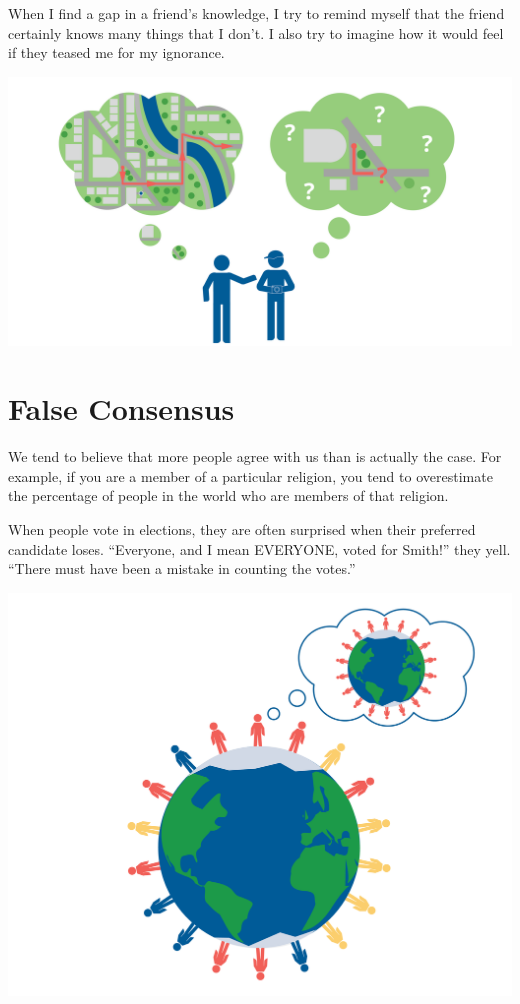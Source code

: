 When I find a gap in a friend's knowledge, I try to remind myself that
the friend certainly knows many things that I don't. I also try to
imagine how it would feel if they teased me for my ignorance.

\includegraphics[width=1\textwidth]{curseOfKnowledge.png}

\section{False Consensus}

We tend to believe that more people agree with us than is actually
the case. For example, if you are a member of a particular religion,
you tend to overestimate the percentage of people in the world who are
members of that religion.

When people vote in elections, they are often surprised when their
preferred candidate loses. ``Everyone, and I mean EVERYONE, voted for
Smith!'' they yell.  ``There must have been a mistake in counting the
votes.''

\includegraphics[width=1\textwidth]{falseConsensus.png}


